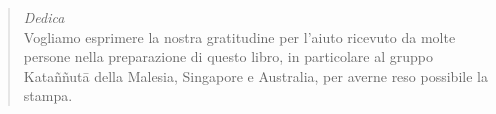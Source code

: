 \cleartorecto
\thispagestyle{empty}

\mbox{}
\vfill

\begin{quote}

\centering
\emph{Dedica}\\[0.6\baselineskip]
Vogliamo esprimere la nostra gratitudine per l’aiuto ricevuto da molte persone
nella preparazione di questo libro, in particolare al gruppo Kataññutā della
Malesia, Singapore e Australia, per averne reso possibile la stampa.

\end{quote}

\vspace*{4\baselineskip}

\vfill
\mbox{}

